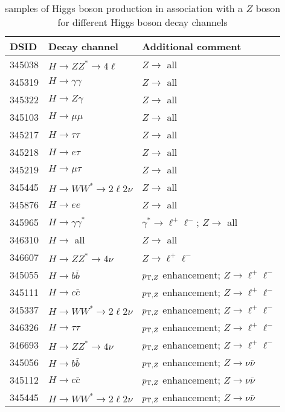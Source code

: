 \begin{table}[!htbp]
\begin{center}
\caption{\POWPY[8] samples of Higgs boson production in association with a $Z$ boson for different Higgs boson decay channels} 
\label{tab:higgs-ZH-samples}
\begin{tabular}{ l | l | l}
\hline
DSID   & Decay channel & Additional comment \\
\hline
345038 & $H\to ZZ^{*} \to 4\ell$ & $Z\to$ all\\
345319 & $H\to \gamma\gamma$ & $Z\to$ all\\
345322 & $H\to Z\gamma$ & $Z\to$ all\\
345103 & $H\to\mu\mu$ & $Z\to$ all\\ 
345217 & $H\to\tau\tau$& $Z\to$ all\\ 
345218 & $H\to e\tau$ &$Z\to$ all\\
345219 & $H\to \mu\tau$&$Z\to$ all\\
345445 &$H\to WW^{*} \to 2\ell2\nu $ & $Z\to$ all \\
345876 & $H\to ee$ &$Z\to$ all \\
345965 &  $H\to \gamma\gamma^{*}$ & $\gamma^{*}\to \ell^{+}\ell^{-}$; $Z\to$ all\\
346310 & $H\to$ all&$Z\to$ all\\
346607 & $H\to ZZ^{*} \to 4\nu $ &$Z\to \ell^{+}\ell^{-}$ \\
345055 & $H\to b\bar{b}$ & $p_{{\textrm T},Z}$ enhancement; $Z\to \ell^{+}\ell^{-}$\\
345111 & $H\to c\bar{c}$ & $p_{{\textrm T},Z}$ enhancement; $Z\to \ell^{+}\ell^{-}$\\
345337 & $H\to WW^{*} \to 2\ell2\nu $ &$p_{{\textrm T},Z}$ enhancement; $Z\to \ell^{+}\ell^{-}$\\
346326 & $H\to\tau\tau$& $p_{{\textrm T},Z}$ enhancement; $Z\to \ell^{+}\ell^{-}$\\
346693 & $H\to ZZ^{*} \to 4\nu $ & $p_{{\textrm T},Z}$ enhancement; $Z\to \ell^{+}\ell^{-}$\\
345056 & $H\to b\bar{b}$ & $p_{{\textrm T},Z}$ enhancement; $Z\to \nu\bar{\nu}$\\
345112 & $H\to c\bar{c}$ & $p_{{\textrm T},Z}$ enhancement; $Z\to \nu\bar{\nu}$\\
345445 & $H\to WW^{*} \to 2\ell2\nu$  & $p_{{\textrm T},Z}$ enhancement; $Z\to \nu\bar{\nu}$\\
\hline
\end{tabular}
\end{center}
\end{table}


